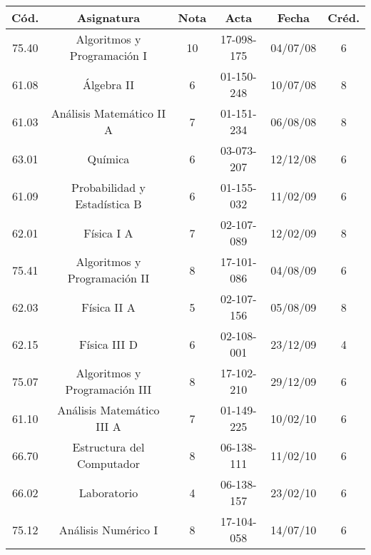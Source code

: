     \small{
        \begin{center}
        \hspace*{-1cm}
        \begin{tabular}{|c|c|c|c|c|c|}
            \hline
            \textbf{Cód.} & \textbf{Asignatura} & \textbf{Nota} & \textbf{Acta} & \textbf{Fecha} & \textbf{Créd.} \\ 
            \hline
            75.40 & Algoritmos y Programación I                & 10 & 17-098-175 & 04/07/08 & 6 \\
            \hline
            61.08 & Álgebra II                                 & 6  & 01-150-248 & 10/07/08 & 8 \\
            \hline
            61.03 & Análisis Matemático II A                   & 7  & 01-151-234 & 06/08/08 & 8 \\
            \hline
            63.01 & Química                                    & 6  & 03-073-207 & 12/12/08 & 6 \\
            \hline
            61.09 & Probabilidad y Estadística B               & 6  & 01-155-032 & 11/02/09 & 6 \\
            \hline
            62.01 & Física I A                                 & 7  & 02-107-089 & 12/02/09 & 8 \\
            \hline
            75.41 & Algoritmos y Programación II               & 8  & 17-101-086 & 04/08/09 & 6 \\
            \hline 
            62.03 & Física II A                                & 5  & 02-107-156 & 05/08/09 & 8 \\
            \hline
            62.15 & Física III D                               & 6  & 02-108-001 & 23/12/09 & 4 \\
            \hline
            75.07 & Algoritmos y Programación III              & 8  & 17-102-210 & 29/12/09 & 6 \\
            \hline
            61.10 & Análisis Matemático III A                  & 7  & 01-149-225 & 10/02/10 & 6 \\
            \hline 
            66.70 & Estructura del Computador                  & 8  & 06-138-111 & 11/02/10 & 6 \\
            \hline
            66.02 & Laboratorio                                & 4  & 06-138-157 & 23/02/10 & 6 \\
            \hline
            75.12 & Análisis Numérico I                        & 8  & 17-104-058 & 14/07/10 & 6 \\

\end{tabular}
\end{center}}
